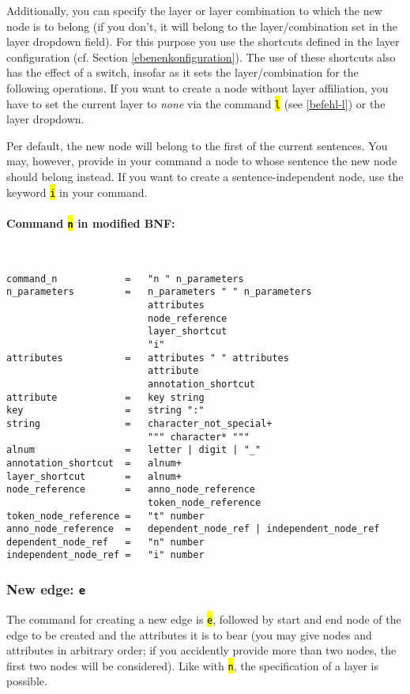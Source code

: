 \documentclass[12pt]{scrartcl}
\newcommand{\code}[1]{\hl{\texttt{#1}}}
\begin{document}
Additionally, you can specify the layer or layer combination to which the new node is to belong (if you don’t, it will belong to the layer/combination set in the layer dropdown field).
For this purpose you use the shortcuts defined in the layer configuration (cf. Section \ref{ebenenkonfiguration}).
The use of these shortcuts also has the effect of a switch, insofar as it sets the layer/combination for the following operations.
If you want to create a node without layer affiliation, you have to set the current layer to \textit{none} via the command \code{l} (see \ref{befehl-l}) or the layer dropdown.

Per default, the new node will belong to the first of the current sentences.
You may, however, provide in your command a node to whose sentence the new node should belong instead.
If you want to create a sentence-independent node, use the keyword \code{i} in your command.

\paragraph*{Command \code{n} in modified BNF:}
~
\begin{lstlisting}
command_n            =   "n " n_parameters
n_parameters         =   n_parameters " " n_parameters
                         attributes
                         node_reference
                         layer_shortcut
                         "i"
attributes           =   attributes " " attributes
                         attribute
                         annotation_shortcut
attribute            =   key string
key                  =   string ":"
string               =   character_not_special+
                         """ character* """
alnum                =   letter | digit | "_"
annotation_shortcut  =   alnum+
layer_shortcut       =   alnum+
node_reference       =   anno_node_reference
                         token_node_reference
token_node_reference =   "t" number
anno_node_reference  =   dependent_node_ref | independent_node_ref
dependent_node_ref   =   "n" number
independent_node_ref =   "i" number
\end{lstlisting}


\subsubsection{New edge: \texttt{e}}

The command for creating a new edge is \code{e}, followed by start and end node of the edge to be created and the attributes it is to bear (you may give nodes and attributes in arbitrary order; if you accidently provide more than two nodes, the first two nodes will be considered).
Like with \code{n}, the specification of a layer is possible.
\end{document}

